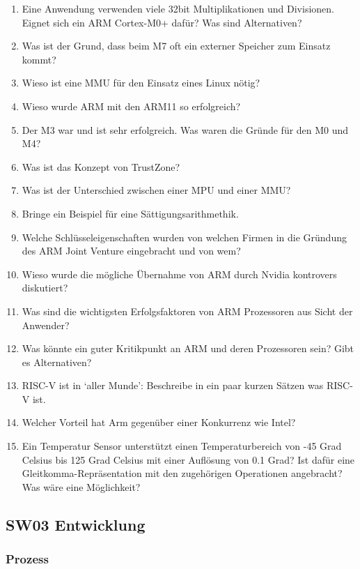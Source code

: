 \documentclass[
  10pt,
  a4paper,
]{article}
\numberwithin{equation}{section}
\begin{document}
\begin{enumerate}
\def\labelenumi{\arabic{enumi}.}
\item
  Eine Anwendung verwenden viele 32bit Multiplikationen und Divisionen.
  Eignet sich ein ARM Cortex-M0+ dafür? Was sind Alternativen?
\item
  Was ist der Grund, dass beim M7 oft ein externer Speicher zum Einsatz
  kommt?
\item
  Wieso ist eine MMU für den Einsatz eines Linux nötig?
\item
  Wieso wurde ARM mit den ARM11 so erfolgreich?
\item
  Der M3 war und ist sehr erfolgreich. Was waren die Gründe für den M0
  und M4?
\item
  Was ist das Konzept von TrustZone?
\item
  Was ist der Unterschied zwischen einer MPU und einer MMU?
\item
  Bringe ein Beispiel für eine Sättigungsarithmethik.
\item
  Welche Schlüsseleigenschaften wurden von welchen Firmen in die
  Gründung des ARM Joint Venture eingebracht und von wem?
\item
  Wieso wurde die mögliche Übernahme von ARM durch Nvidia kontrovers
  diskutiert?
\item
  Was sind die wichtigsten Erfolgsfaktoren von ARM Prozessoren aus Sicht
  der Anwender?
\item
  Was könnte ein guter Kritikpunkt an ARM und deren Prozessoren sein?
  Gibt es Alternativen?
\item
  RISC-V ist in `aller Munde': Beschreibe in ein paar kurzen Sätzen was
  RISC-V ist.
\item
  Welcher Vorteil hat Arm gegenüber einer Konkurrenz wie Intel?
\item
  Ein Temperatur Sensor unterstützt einen Temperaturbereich von -45 Grad
  Celsius bis 125 Grad Celsius mit einer Auflösung von 0.1 Grad? Ist
  dafür eine Gleitkomma-Repräsentation mit den zugehörigen Operationen
  angebracht? Was wäre eine Möglichkeit?
\end{enumerate}

\hypertarget{sw03-entwicklung}{%
\subsection{SW03 Entwicklung}\label{sw03-entwicklung}}

\hypertarget{prozess}{%
\subsubsection{Prozess}\label{prozess}}
\end{document}
